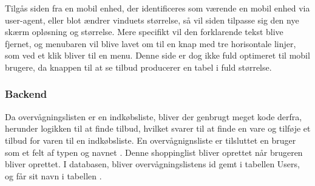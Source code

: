 Tilgås siden fra en mobil enhed, der identificeres som værende en mobil enhed via user-agent, eller blot ændrer vinduets størrelse, så vil siden tilpasse sig den nye skærm opløsning og størrelse.
Mere specifikt vil den forklarende tekst blive fjernet, og menubaren vil blive lavet om til en knap med tre horisontale linjer, som ved et klik bliver til en menu.
Denne side er dog ikke fuld optimeret til mobil brugere, da knappen til at se tilbud producerer en tabel i fuld størrelse. 
\subsubsection{Backend}
Da overvågningslisten er en indkøbsliste, bliver der genbrugt meget kode derfra, herunder logikken til at finde tilbud, hvilket svarer til at finde en vare og tilføje et tilbud for varen til en indkøbsliste. 
En overvågnignsliste er tilsluttet en bruger som et felt af typen  og navnet . %
Denne shoppinglist bliver oprettet når brugeren bliver oprettet.
I databasen, bliver overvågningslistens id gemt i tabellen Users, og får sit navn  i tabellen .

